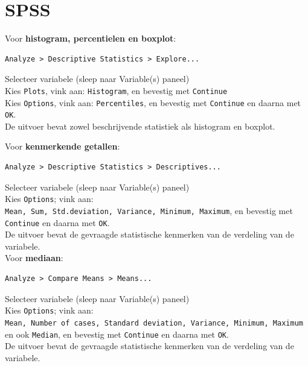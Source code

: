\documentclass[
]{book}
\begin{document}
\hypertarget{spss-3}{%
\section{SPSS}\label{spss-3}}

Voor \textbf{histogram, percentielen en boxplot}:

\begin{verbatim}
Analyze > Descriptive Statistics > Explore...
\end{verbatim}

Selecteer variabele (sleep naar Variable(s) paneel)\\
Kies \texttt{Plots}, vink aan: \texttt{Histogram}, en bevestig met \texttt{Continue}\\
Kies \texttt{Options}, vink aan: \texttt{Percentiles}, en bevestig met \texttt{Continue} en
daarna met \texttt{OK}.\\
De uitvoer bevat zowel beschrijvende statistiek als histogram en
boxplot.

Voor \textbf{kenmerkende getallen}:\\

\begin{verbatim}
Analyze > Descriptive Statistics > Descriptives...
\end{verbatim}

Selecteer variabele (sleep naar Variable(s) paneel)\\
Kies \texttt{Options}; vink aan:
\texttt{Mean,\ Sum,\ Std.deviation,\ Variance,\ Minimum,\ Maximum}, en bevestig met
\texttt{Continue} en daarna met \texttt{OK}.\\
De uitvoer bevat de gevraagde statistische kenmerken van de verdeling
van de variabele.\\

Voor \textbf{mediaan}:\\

\begin{verbatim}
Analyze > Compare Means > Means...
\end{verbatim}

Selecteer variabele (sleep naar Variable(s) paneel)\\
Kies \texttt{Options}; vink aan:
\texttt{Mean,\ Number\ of\ cases,\ Standard\ deviation,\ Variance,\ Minimum,\ Maximum}
en ook \texttt{Median}, en bevestig met \texttt{Continue} en daarna met \texttt{OK}.\\
De uitvoer bevat de gevraagde statistische kenmerken van de verdeling
van de variabele.\\
\end{document}
